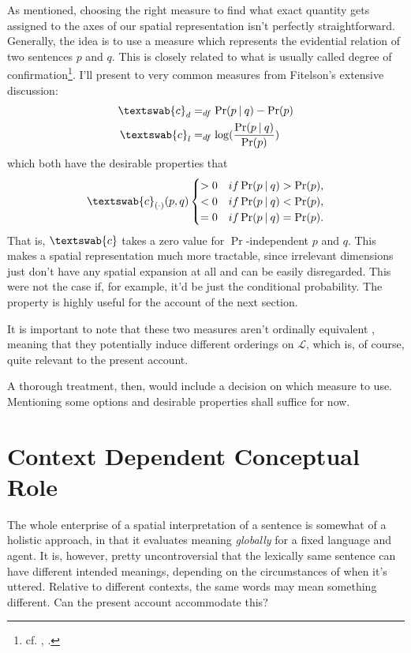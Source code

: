 \documentclass[11pt, a4paper]{scrartcl}
\renewcommand{\i}[1]{\emph{#1}}
\renewcommand{\L}{\mathcal{L}}
\newcommand{\m}[1]{\textswab{#1}}
\newcommand{\given}[1][]{\:#1\vert\:}
\begin{document}
As mentioned, choosing the right measure to find what exact quantity gets assigned to the axes of our spatial representation isn't perfectly straightforward. Generally, the idea is to use a measure which represents the evidential relation of two sentences $p$ and $q$. This is closely related to what is usually called degree of confirmation\footnote{cf. \textcite{Fitelson1999-FITTPO-3}, \textcite{Broessel2013}.}. I'll present to very common measures from Fitelson's extensive discussion: 
\begin{align*}
    \m{c}_d &=_{df} \Pr(p\given q) - \Pr(p)\\
    \m{c}_l &=_{df} \log(\frac{\Pr(p\given q)}{\Pr(p)})
\end{align*}
which both have the desirable properties that
\[
\m{c}_{(\cdot)}(p, q) 
    \begin{cases} 
        > 0 & if \Pr(p \given q) > \Pr(p),\\
        < 0 & if \Pr(p \given q) < \Pr(p),\\
        = 0 & if \Pr(p \given q) = \Pr(p).
    \end{cases}
\]
That is, $\m{c}$ takes a zero value for $\Pr$-independent $p$ and $q$. This makes a spatial representation much more tractable, since irrelevant dimensions just don't have any spatial expansion at all and can be easily disregarded. This were not the case if, for example, it'd be just the conditional probability. The property is highly useful for the account of the next section. 

It is important to note that these two measures aren't ordinally equivalent \parencite[364]{Fitelson1999-FITTPO-3}, meaning that they potentially induce different orderings on $\L$, which is, of course, quite relevant to the present account.

A thorough treatment, then, would include a decision on which measure to use. Mentioning some options and desirable properties shall suffice for now. 

\section{Context Dependent Conceptual Role}\label{sec:contexts}

The whole enterprise of a spatial interpretation of a sentence is somewhat of a holistic approach, in that it evaluates meaning \i{globally} for a fixed language and agent. It is, however, pretty uncontroversial that the lexically same sentence can have different intended meanings, depending on the circumstances of when it's uttered. Relative to different contexts, the same words may mean something different. Can the present account accommodate this? 
\end{document}
